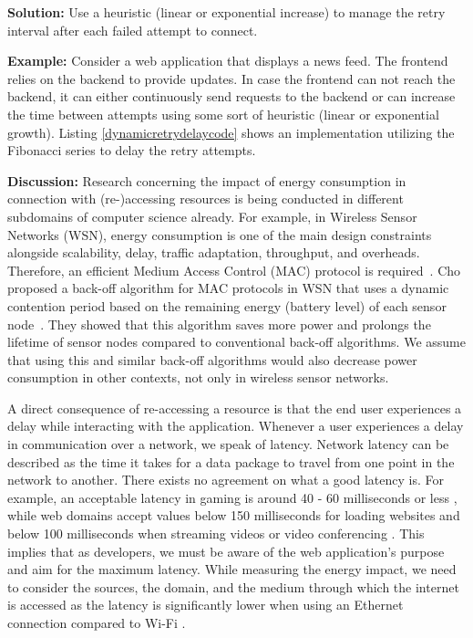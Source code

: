 \textbf{Solution:} Use a heuristic (\eg linear or exponential increase) to manage the retry interval after each failed attempt to connect.

\textbf{Example:} Consider a web application that displays a news feed. The frontend relies on the backend to provide updates. In case the frontend can not reach the backend, it can either continuously send requests to the backend or can increase the time between attempts using some sort of heuristic (\eg linear or exponential growth).  Listing \ref{dynamicretrydelaycode} shows an implementation utilizing the Fibonacci series to delay the retry attempts.



\textbf{Discussion:} Research concerning the impact of energy consumption in connection with (re-)accessing resources is being conducted in different subdomains of computer science already. For example, in Wireless Sensor Networks (WSN), energy consumption is one of the main design constraints alongside scalability, delay, traffic adaptation, throughput, and overheads. Therefore, an efficient Medium Access Control (MAC) protocol is required~\cite{Kaur2016}. Cho \etal proposed a back-off algorithm for MAC protocols in WSN that uses a dynamic contention period based on the remaining energy (\ie battery level) of each sensor node~\cite{Cho2006}. They showed that this algorithm saves more power and prolongs the lifetime of sensor nodes compared to conventional back-off algorithms. We assume that using this and similar back-off algorithms would also decrease power consumption in other contexts, not only in wireless sensor networks.

A direct consequence of re-accessing a resource is that the end user experiences a delay while interacting with the application. Whenever a user experiences a delay in communication over a network, we speak of latency. Network latency can be described as the time it takes for a data package to travel from one point in the network to another.  There exists no agreement on what a good latency is. For example, an acceptable latency in gaming is around 40 - 60 milliseconds or less \cite{gaming-latency},
 while web domains accept values below 150 milliseconds for loading websites \cite{website-latency}
and below 100 milliseconds
when streaming videos or video conferencing \cite{latency-video}. This implies that as developers, we must be aware of the web application's purpose and aim for the maximum latency. While measuring the energy impact, we need to consider the sources, the domain, and the medium through which the internet is accessed as the latency is significantly lower when using an Ethernet connection compared to Wi-Fi \cite{ethernet-vs-wifi}. 

